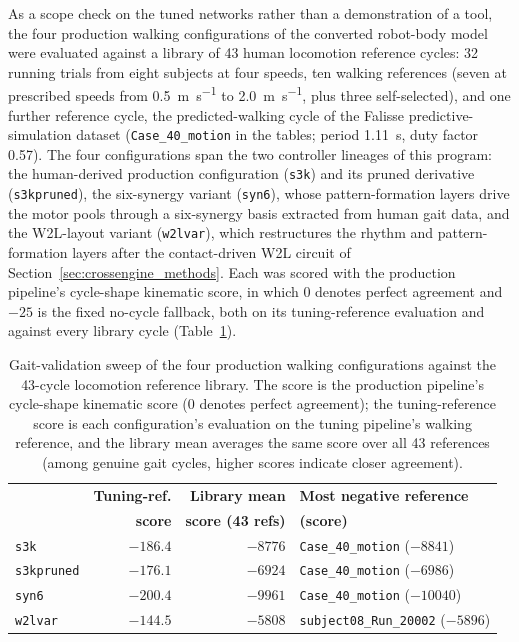 As a scope check on the tuned networks rather than a demonstration of a tool, the four production walking configurations of the converted robot-body model were evaluated against a library of 43 human locomotion reference cycles: 32 running trials from eight subjects at four speeds, ten walking references (seven at prescribed speeds from \qty{0.5}{\metre\per\second} to \qty{2.0}{\metre\per\second}, plus three self-selected), and one further reference cycle, the predicted-walking cycle of the Falisse predictive-simulation dataset (\texttt{Case\_40\_motion} in the tables; period \qty{1.11}{\second}, duty factor 0.57). The four configurations span the two controller lineages of this program: the human-derived production configuration (\texttt{s3k}) and its pruned derivative (\texttt{s3kpruned}), the six-synergy variant (\texttt{syn6}), whose pattern-formation layers drive the motor pools through a six-synergy basis extracted from human gait data, and the W2L-layout variant (\texttt{w2lvar}), which restructures the rhythm and pattern-formation layers after the contact-driven W2L circuit of Section~\ref{sec:crossengine_methods}. Each was scored with the production pipeline's cycle-shape kinematic score, in which 0 denotes perfect agreement and $-25$ is the fixed no-cycle fallback, both on its tuning-reference evaluation and against every library cycle (Table~\ref{tab:gait_sweep}).

\begin{table}[htbp]
\caption{Gait-validation sweep of the four production walking configurations against the 43-cycle locomotion reference library. The score is the production pipeline's cycle-shape kinematic score (0 denotes perfect agreement); the tuning-reference score is each configuration's evaluation on the tuning pipeline's walking reference, and the library mean averages the same score over all 43 references (among genuine gait cycles, higher scores indicate closer agreement).}
\label{tab:gait_sweep}
\begin{tabular}{@{}lrrl@{}}
\toprule
 & \textbf{Tuning-ref.} & \textbf{Library mean} & \textbf{Most negative reference} \\
 & \textbf{score} & \textbf{score (43 refs)} & \textbf{(score)} \\
\midrule
\texttt{s3k}        & $-186.4$ & $-8776$ & \texttt{Case\_40\_motion} ($-8841$) \\
\texttt{s3kpruned}  & $-176.1$ & $-6924$ & \texttt{Case\_40\_motion} ($-6986$) \\
\texttt{syn6}       & $-200.4$ & $-9961$ & \texttt{Case\_40\_motion} ($-10040$) \\
\texttt{w2lvar}     & $-144.5$ & $-5808$ & \texttt{subject08\_Run\_20002} ($-5896$) \\
\bottomrule
\end{tabular}
\end{table}

